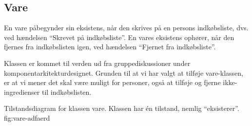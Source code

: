 \subsection{Vare}
En vare påbegynder sin eksistens, når den skrives på en persons indkøbsliste, dvs. ved hændelsen ``Skrevet på indkøbsliste''. En vares eksistens ophører, når den fjernes fra indkøbslisten igen, ved hændelsen ``Fjernet fra indkøbsliste''.

Klassen er kommet til verden ud fra gruppediskussioner under komponentarkitekturdesignet. Grunden til at vi har valgt at tilføje vare-klassen, er at vi mener det skal være muligt for personer, også at tilføje og fjerne ikke-ingredienser til indkøbslisten.  

  {Tilstandsdiagram for klassen vare. Klassen har én tilstand, nemlig ``eksisterer''.}
  {fig:vare-adfaerd}
  

